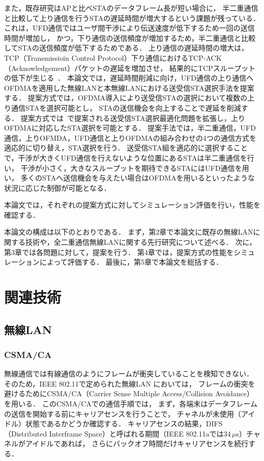 \documentclass[master]{kuisthesis}		%
\begin{document}
\par
また，既存研究はAPと比べSTAのデータフレーム長が短い場合に，
半二重通信と比較して上り通信を行うSTAの遅延時間が増大するという課題が残っている．
これは，UFD通信ではユーザ間干渉により伝送速度が低下するため一回の送信時間が増加し，
かつ，下り通信の送信頻度が増加するため，半二重通信と比較してSTAの送信頻度が低下するためである．
上り通信の遅延時間の増大は，TCP（Transmissioin Control Protocol）下り通信におけるTCP-ACK（Acknowledgement）パケットの遅延を増加させ，
結果的にTCPスループットの低下が生じる~\cite{rtt}．
本論文では，遅延時間削減に向け，UFD通信の上り通信へOFDMAを適用した無線LANと本無線LANにおける送受信STA選択手法を提案する．
提案方式では，OFDMA導入により送受信STAの選択において複数の上り通信STAを選択可能とし，
STAの送信機会を向上することで遅延を削減する．
提案方式では~\cite{promac_fair}で提案される送受信STA選択最適化問題を拡張し，上りOFDMAに対応したSTA選択を可能とする．
提案手法では，半二重通信，UFD通信，上りOFMDA，UFD通信と上りOFDMAの組み合わせの4つの通信方式を適応的に切り替え，STA選択を行う．
送受信STA組を適応的に選択することで，干渉が大きくUFD通信を行えないような位置にあるSTAは半二重通信を行い，
干渉が小さく，大きなスループットを期待できるSTAにはUFD通信を用い，
多くのSTAへ送信機会を与えたい場合はOFDMAを用いるといったような状況に応じた制御が可能となる．
\par
本論文では，それぞれの提案方式に対してシミュレーション評価を行い，性能を確認する．
\par
本論文の構成は以下のとおりである．
まず，第2章で本論文に既存の無線LANに関する技術や，全二重通信無線LANに関する先行研究について述べる．
次に，第3章では各問題に対して，提案を行う．
第4章では，提案方式の性能をシミュレーションによって評価する．
最後に，第5章で本論文を総括する．

\section{関連技術}
	\subsection{無線LAN}
		\subsubsection{CSMA/CA}
			無線通信では有線通信のようにフレームが衝突していることを検知できない．
			そのため，{IEEE} 802.11で定められた無線LAN においては，
			フレームの衝突を避けるためにCSMA/CA（Carrier Sense Multiple Access/Collision Avoidance）を用いる\cite{mori}．
			このCSMA/CAでの通信手順では，
			まず，各端末はデータフレームの送信を開始する前にキャリアセンスを行うことで，
			チャネルが未使用（アイドル）状態であるかどうか確認する．
			キャリアセンスの結果，DIFS（Distributed Interframe Space）と呼ばれる期間（IEEE 802.11aでは34\,$\mu$s）チャネルがアイドルであれば，
			さらにバックオフ時間だけキャリアセンスを続行する．
\end{document}
